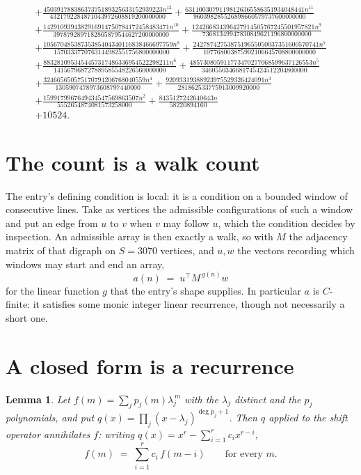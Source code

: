 \documentclass[11pt,a4paper]{article}
\theoremstyle{plain}
\newtheorem{lemma}[theorem]{Lemma}
\theoremstyle{definition}
\begin{document}
\begin{multline*}
+ \frac{45039178838637375189325633152939223 n^{12}}{4321792284871043972608819200000000} + \frac{63110030791198126365586351934048441 n^{11}}{960398285526898660579737600000000} \\
+ \frac{1429109394382916914750784172458483471 n^{10}}{3978792897182865879544627200000000} + \frac{124266834396427914505767245501957821 n^{9}}{73681349947830849621196800000000} \\
+ \frac{10567048538735385404340116838466697759 n^{8}}{1570333770763144982551756800000000} + \frac{2427874275387519655050037351600570741 n^{7}}{107768003875902106645708800000000} \\
+ \frac{8832810953454457317486336954522298211 n^{6}}{141567968727889585548226560000000} + \frac{485730805911773470277068599637126553 n^{5}}{3460550346681745424512204800000} \\
+ \frac{324665650575170794206768040559 n^{4}}{1305907478973608797440000} + \frac{92093319388923975529326424091 n^{3}}{281862533775913009920000} \\
+ \frac{1599179967649434547569863507 n^{2}}{5552654874081573258000} + \frac{8435127242640643 n}{58220894160} \\
+ 10524.
\end{multline*}

\section{The count is a walk count}

The entry's defining condition is local: it is a condition on a bounded window of consecutive lines. Take as vertices the
admissible configurations of such a window and put an edge from $u$ to $v$ when $v$ may
follow $u$, which the condition decides by inspection. An admissible array is then exactly a
walk, so with $M$ the adjacency matrix of that digraph on $S=3070$ vertices, and $u,w$ the
vectors recording which windows may start and end an array,
\[
a(n)\;=\;u^{\!\top}M^{\,g(n)}w
\]
for the linear function $g$ that the entry's shape supplies. In particular $a$ is
$C$-finite: it satisfies some monic integer linear recurrence, though not necessarily a short
one.

\section{A closed form is a recurrence}

\begin{lemma}\label{lem:ann}
Let $f(m)=\sum_{j}p_j(m)\lambda_j^{\,m}$ with the $\lambda_j$ distinct and the $p_j$
polynomials, and put $q(x)=\prod_j(x-\lambda_j)^{\deg p_j+1}$. Then $q$ applied to the shift
operator annihilates $f$: writing $q(x)=x^{r}-\sum_{i=1}^{r}c_ix^{r-i}$,
\[
f(m)\;=\;\sum_{i=1}^{r}c_i\,f(m-i)\qquad\text{for every }m.
\]
\end{lemma}
\end{document}
